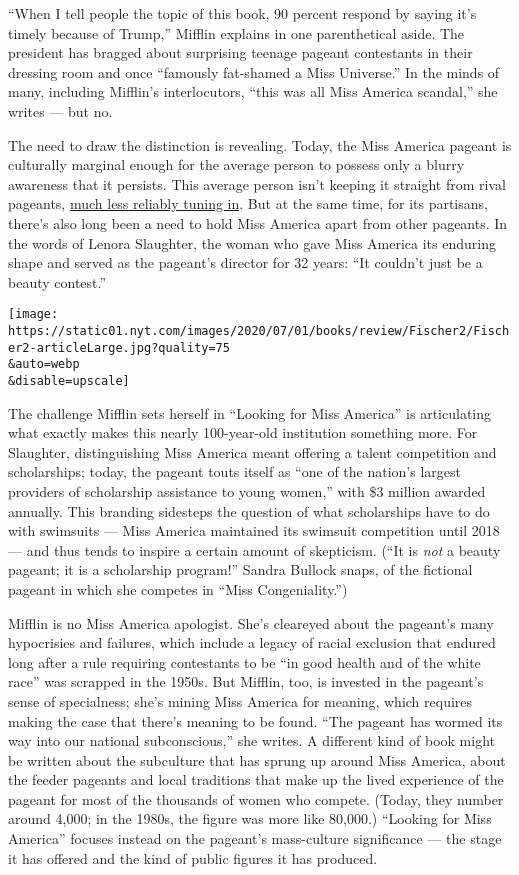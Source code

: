``When I tell people the topic of this book, 90 percent respond by
saying it's timely because of Trump,'' Mifflin explains in one
parenthetical aside. The president has bragged about surprising teenage
pageant contestants in their dressing room and once ``famously
fat-shamed a Miss Universe.'' In the minds of many, including Mifflin's
interlocutors, ``this was all Miss America scandal,'' she writes --- but
no.

The need to draw the distinction is revealing. Today, the Miss America
pageant is culturally marginal enough for the average person to possess
only a blurry awareness that it persists. This average person isn't
keeping it straight from rival pageants,
\href{https://www.hollywoodreporter.com/live-feed/miss-america-2020-tv-ratings-thursday-dec-19-2019-1264411\#:~:text=For\%20the\%20second\%20straight\%20year,rating\%20in\%20adults\%2018\%2D49.}{much
less reliably tuning in}. But at the same time, for its partisans,
there's also long been a need to hold Miss America apart from other
pageants. In the words of Lenora Slaughter, the woman who gave Miss
America its enduring shape and served as the pageant's director for 32
years: ``It couldn't just be a beauty contest.''

\texttt{[image: https://static01.nyt.com/images/2020/07/01/books/review/Fischer2/Fischer2-articleLarge.jpg?quality=75\\\&auto=webp\\\&disable=upscale]}

The challenge Mifflin sets herself in ``Looking for Miss America'' is
articulating what exactly makes this nearly 100-year-old institution
something more. For Slaughter, distinguishing Miss America meant
offering a talent competition and scholarships; today, the pageant touts
itself as ``one of the nation's largest providers of scholarship
assistance to young women,'' with \$3 million awarded annually. This
branding sidesteps the question of what scholarships have to do with
swimsuits --- Miss America maintained its swimsuit competition until
2018 --- and thus tends to inspire a certain amount of skepticism. (``It
is \emph{not} a beauty pageant; it is a scholarship program!'' Sandra
Bullock snaps, of the fictional pageant in which she competes in ``Miss
Congeniality.'')

Mifflin is no Miss America apologist. She's cleareyed about the
pageant's many hypocrisies and failures, which include a legacy of
racial exclusion that endured long after a rule requiring contestants to
be ``in good health and of the white race'' was scrapped in the 1950s.
But Mifflin, too, is invested in the pageant's sense of specialness;
she's mining Miss America for meaning, which requires making the case
that there's meaning to be found. ``The pageant has wormed its way into
our national subconscious,'' she writes. A different kind of book might
be written about the subculture that has sprung up around Miss America,
about the feeder pageants and local traditions that make up the lived
experience of the pageant for most of the thousands of women who
compete. (Today, they number around 4,000; in the 1980s, the figure was
more like 80,000.) ``Looking for Miss America'' focuses instead on the
pageant's mass-culture significance --- the stage it has offered and the
kind of public figures it has produced.

